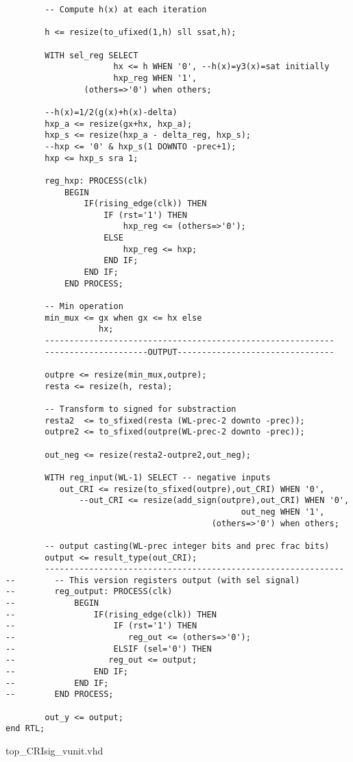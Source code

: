 \begin{code}
\begin{verbatim}
        -- Compute h(x) at each iteration

        h <= resize(to_ufixed(1,h) sll ssat,h);

        WITH sel_reg SELECT 
                      hx <= h WHEN '0', --h(x)=y3(x)=sat initially
                      hxp_reg WHEN '1',
                (others=>'0') when others;
        
        --h(x)=1/2(g(x)+h(x)-delta)
        hxp_a <= resize(gx+hx, hxp_a);
        hxp_s <= resize(hxp_a - delta_reg, hxp_s);
        --hxp <= '0' & hxp_s(1 DOWNTO -prec+1);
        hxp <= hxp_s sra 1;
        
        reg_hxp: PROCESS(clk)
            BEGIN
                IF(rising_edge(clk)) THEN
                    IF (rst='1') THEN
                        hxp_reg <= (others=>'0');
                    ELSE
                        hxp_reg <= hxp;
                    END IF;
                END IF;
            END PROCESS;

        -- Min operation
        min_mux <= gx when gx <= hx else
                   hx;
        -----------------------------------------------------------
        ---------------------OUTPUT--------------------------------	
    
        outpre <= resize(min_mux,outpre);
        resta <= resize(h, resta);
        
        -- Transform to signed for substraction
        resta2  <= to_sfixed(resta (WL-prec-2 downto -prec));
        outpre2 <= to_sfixed(outpre(WL-prec-2 downto -prec)); 

        out_neg <= resize(resta2-outpre2,out_neg);
                                
        WITH reg_input(WL-1) SELECT -- negative inputs
	       out_CRI <= resize(to_sfixed(outpre),out_CRI) WHEN '0',
               --out_CRI <= resize(add_sign(outpre),out_CRI) WHEN '0',
                                                out_neg WHEN '1',
                                          (others=>'0') when others;	
                                      
        -- output casting(WL-prec integer bits and prec frac bits) 
        output <= result_type(out_CRI);
        -------------------------------------------------------------
--        -- This version registers output (with sel signal)
--        reg_output: PROCESS(clk)
--            BEGIN
--                IF(rising_edge(clk)) THEN
--                    IF (rst='1') THEN
--                       reg_out <= (others=>'0');
--                    ELSIF (sel='0') THEN
--                   reg_out <= output;
--                END IF;
--            END IF;
--        END PROCESS;
        
        out_y <= output;
end RTL;
\end{verbatim}
\caption{top\_CRIsig\_vunit.vhd}
\label{ap-cod:24}
\end{code}

